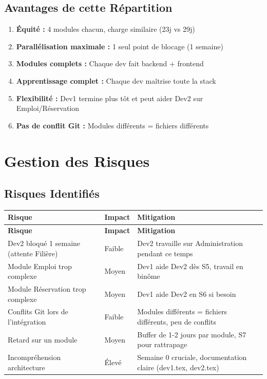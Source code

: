 \documentclass[12pt,a4paper]{article}
\begin{document}
\subsection{Avantages de cette Répartition}

\begin{enumerate}
    \item \textbf{Équité :} 4 modules chacun, charge similaire (23j vs 29j)
    \item \textbf{Parallélisation maximale :} 1 seul point de blocage (1 semaine)
    \item \textbf{Modules complets :} Chaque dev fait backend + frontend
    \item \textbf{Apprentissage complet :} Chaque dev maîtrise toute la stack
    \item \textbf{Flexibilité :} Dev1 termine plus tôt et peut aider Dev2 sur Emploi/Réservation
    \item \textbf{Pas de conflit Git :} Modules différents = fichiers différents
\end{enumerate}

\newpage

\section{Gestion des Risques}

\subsection{Risques Identifiés}

\begin{longtable}{|p{5cm}|p{3cm}|p{6cm}|}
\hline
\textbf{Risque} & \textbf{Impact} & \textbf{Mitigation} \\
\hline
\endfirsthead
\hline
\textbf{Risque} & \textbf{Impact} & \textbf{Mitigation} \\
\hline
\endhead
Dev2 bloqué 1 semaine (attente Filière) & Faible & Dev2 travaille sur Administration pendant ce temps \\
\hline
Module Emploi trop complexe & Moyen & Dev1 aide Dev2 dès S5, travail en binôme \\
\hline
Module Réservation trop complexe & Moyen & Dev1 aide Dev2 en S6 si besoin \\
\hline
Conflits Git lors de l'intégration & Faible & Modules différents = fichiers différents, peu de conflits \\
\hline
Retard sur un module & Moyen & Buffer de 1-2 jours par module, S7 pour rattrapage \\
\hline
Incompréhension architecture & Élevé & Semaine 0 cruciale, documentation claire (dev1.tex, dev2.tex) \\
\hline
\end{longtable}
\end{document}
